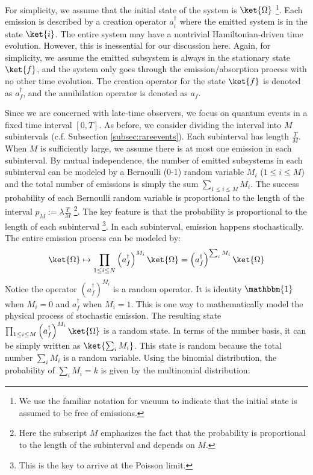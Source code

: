 \documentclass[a4paper,11pt]{article}
\theoremstyle{definition}
\numberwithin{equation}{section}
\newcommand{\lb}{\left(}
\newcommand{\rb}{\right)}
\begin{document}
For simplicity, we assume that the initial state of the system is $\ket{\Omega}$ \footnote{We use the familiar notation for vacuum to indicate that the initial state is assumed to be free of emissions.}. Each emission is described by a creation operator $a^\dagger_i$ where the emitted system is in the state $\ket{i}$. The entire system may have a nontrivial Hamiltonian-driven time evolution. However, this is inessential for our discussion here. Again, for simplicity, we assume the emitted subsystem is always in the stationary state $\ket{f}$, and the system only goes through the emission/absorption process with no other time evolution. The creation operator for the state $\ket{f}$ is denoted as $a^\dagger_f$, and the annihilation operator is denoted as $a_f$. 

Since we are concerned with late-time observers, we focus on quantum events in a fixed time interval $[0,T]$. As before, we consider dividing the interval into $M$ subintervals (c.f. Subsection \ref{subsec:rareevents}). Each subinterval has length $\frac{T}{M}$. When $M$ is sufficiently large, we assume there is at most one emission in each subinterval. By mutual independence, the number of emitted subsystems in each subinterval can be modeled by a Bernoulli (0-1) random variable $M_i$ ($1\leq i\leq M$) and the total number of emissions is simply the sum $\sum_{1\leq i\leq M}M_i$. The success probability of each Bernoulli random variable is proportional to the length of the interval $p_M := \lambda\frac{T}{M}$ \footnote{Here the subscript $M$ emphasizes the fact that the probability is proportional to the length of the subinterval and depends on $M$.}. The key feature is that the probability is proportional to the length of each subinterval \footnote{This is the key to arrive at the Poisson limit.}. In each subinterval, emission happens stochastically. The entire emission process can be modeled by:
\begin{equation}\label{equation:emissionevolution}
    \ket{\Omega}\mapsto\prod_{1\leq i\leq N}\lb a^\dagger_f\rb^{M_i}\ket{\Omega} = \lb a_f^\dagger\rb^{\sum_i M_i}\ket{\Omega}
\end{equation}
Notice the operator $\lb a_f^\dagger\rb^{M_i}$ is a random operator. It is identity $\mathbbm{1}$ when $M_i = 0$ and $a^\dagger_f$ when $M_i = 1$. This is one way to mathematically model the physical process of stochastic emission. The resulting state $\prod_{1\leq i\leq M}\lb a^\dagger_f\rb^{M_i}\ket{\Omega}$ is a random state. In terms of the number basis, it can be simply written as $\ket{\sum_i M_i}$. This state is random because the total number $\sum_i M_i$ is a random variable. Using the binomial distribution, the probability of $\sum_i M_i = k$ is given by the multinomial distribution:
\end{document}

